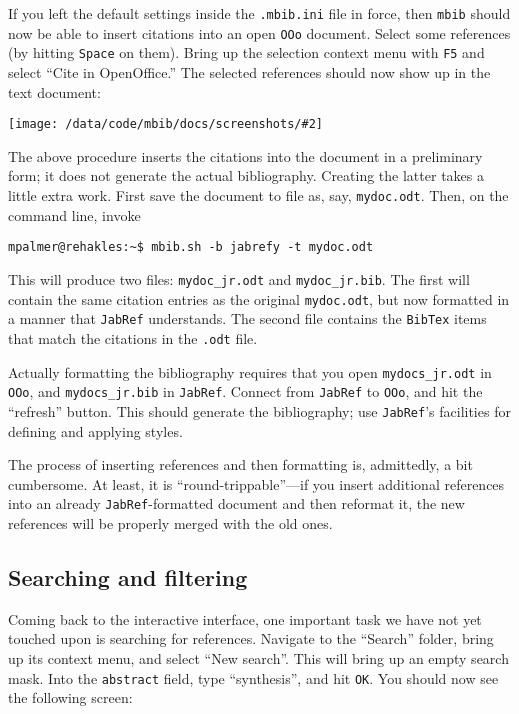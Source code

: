 \documentclass[10pt]{article}
\newcommand*{\mbib}{\texttt{mbib}\xspace}
\newcommand*{\jabref}{\texttt{JabRef}\xspace}
\newcommand*{\ooo}{\texttt{OOo}\xspace}
\newcommand*{\bibtex}{\texttt{BibTex}\xspace}
\newcommand*{\ini}{\texttt{.mbib.ini}\xspace}
\newcommand*{\key}[1]{\texttt{#1}\xspace}
\newcommand{\screenshot}[2][]{%
\medskip\par
\begin{center}
\texttt{[image: /data/code/mbib/docs/screenshots/\#2]}
\end{center}}
\begin{document}
If you left the default settings inside the \ini file in force, then \mbib should now be able to insert citations into an open \ooo document. Select some references (by hitting \key{Space} on them). Bring up the selection context menu with \key{F5} and select ``Cite in OpenOffice.'' The selected references should now show up in the text document:

\screenshot[clip,trim=0 0 3px 0]{cite-ooo}

\noindent The above procedure inserts the citations into the document in a preliminary form; it does not generate the actual bibliography. Creating the latter takes a little extra work. First save the document to file as, say, \texttt{mydoc.odt}. Then, on the command line, invoke 

\begin{verbatim}
mpalmer@rehakles:~$ mbib.sh -b jabrefy -t mydoc.odt
\end{verbatim}

\noindent This will produce two files: \texttt{mydoc\_jr.odt} and \texttt{mydoc\_jr.bib}. The first will contain the same citation entries as the original \texttt{mydoc.odt}, but now formatted in a manner that \jabref understands. The second file contains the \bibtex items that match the citations in the \texttt{.odt} file. 

Actually formatting the bibliography requires that you open \texttt{mydocs\_jr.odt} in \ooo, and \texttt{mydocs\_jr.bib} in \jabref. Connect from \jabref to \ooo, and hit the ``refresh'' button. This should generate the bibliography; use \jabref's facilities for defining and applying styles. 

The process of inserting references and then formatting is, admittedly, a bit cumbersome. At least, it is ``round-trippable''---if you insert additional references into an already \jabref-formatted document and then reformat it, the new references will be properly merged with the old ones. 

\subsection{Searching and filtering}
\label{sec-searching}

Coming back to the interactive interface, one important task we have not yet touched upon is searching for references. Navigate to the ``Search'' folder, bring up its context menu, and select ``New search''. This will bring up an empty search mask. Into the \texttt{abstract} field, type ``synthesis'', and hit \texttt{OK}. You should now see the following screen:
\end{document}
